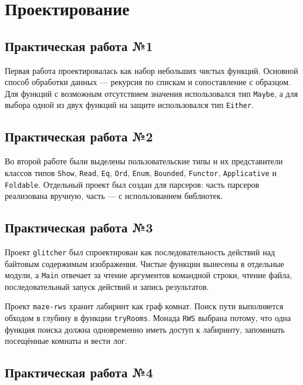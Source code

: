 \section{Проектирование}

\subsection{Практическая работа №1}

Первая работа проектировалась как набор небольших чистых функций. Основной способ обработки данных --- рекурсия по спискам и сопоставление с образцом. Для функций с возможным отсутствием значения использовался тип \texttt{Maybe}, а для выбора одной из двух функций на защите использовался тип \texttt{Either}.

\subsection{Практическая работа №2}

Во второй работе были выделены пользовательские типы и их представители классов типов \texttt{Show}, \texttt{Read}, \texttt{Eq}, \texttt{Ord}, \texttt{Enum}, \texttt{Bounded}, \texttt{Functor}, \texttt{Applicative} и \texttt{Foldable}. Отдельный проект был создан для парсеров: часть парсеров реализована вручную, часть --- с использованием библиотек.

\subsection{Практическая работа №3}

Проект \texttt{glitcher} был спроектирован как последовательность действий над байтовым содержимым изображения. Чистые функции вынесены в отдельные модули, а \texttt{Main} отвечает за чтение аргументов командной строки, чтение файла, последовательный запуск действий и запись результатов.

Проект \texttt{maze-rws} хранит лабиринт как граф комнат. Поиск пути выполняется обходом в глубину в функции \texttt{tryRooms}. Монада \texttt{RWS} выбрана потому, что одна функция поиска должна одновременно иметь доступ к лабиринту, запоминать посещённые комнаты и вести лог.

\subsection{Практическая работа №4}

